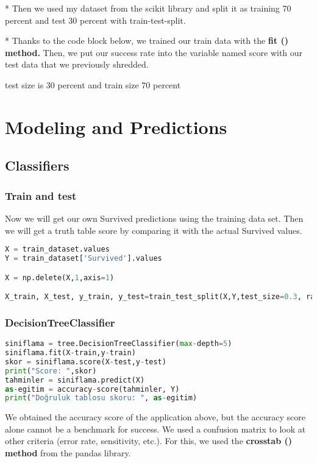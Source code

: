 \documentclass[onecolumn]{article}
\begin{document}
* Then we used my dataset from the scikit library and split it as
 training 70 percent  and test 30 percent with train-test-split.

* Thanks to the code block below, we trained our train data with the \textbf{fit () method.} Then, we put our success rate into the variable named score with our test data that we previously shredded.


test size is 30 percent and train size 70 percent
\section{Modeling and Predictions}

\subsection{Classifiers}

\subsubsection{Train and test }

Now we will get our own Survived predictions using the training data set. Then we will get a truth table score by comparing it with the actual Survived values.

\begin{lstlisting}[language=Python, caption= train and test] 
X = train_dataset.values
Y = train_dataset['Survived'].values

X = np.delete(X,1,axis=1)

X_train, X_test, y_train, y_test=train_test_split(X,Y,test_size=0.3, random_state=0) #test size 30 atadÄ±k train test de 70 oldu
\end{lstlisting}

\subsubsection{DecisionTreeClassifier}

\begin{lstlisting}[language=Python, caption= DecisionTreeClassifier ] 
siniflama = tree.DecisionTreeClassifier(max-depth=5)
siniflama.fit(X-train,y-train)
skor = siniflama.score(X-test,y-test)
print("Score: ",skor)
tahminler = siniflama.predict(X)
as-egitim = accuracy-score(tahminler, Y)
print("Doğruluk tablosu skoru: ", as-egitim)
\end{lstlisting}

 We obtained the accuracy score of the application above, but the
 accuracy score alone cannot be a benchmark for success.
 We used a confusion matrix to look at other criteria (error rate, sensitivity, etc.).
For this, we used the \textbf{crosstab () method} from the pandas library.
\end{document}
